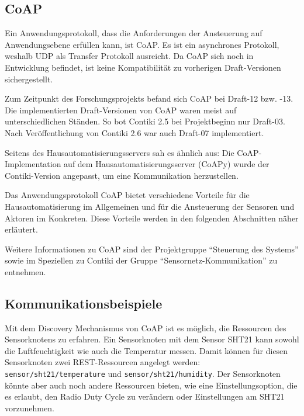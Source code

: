 \subsection{CoAP}
	Ein Anwendungsprotokoll, dass die Anforderungen der Ansteuerung
	auf Anwendungsebene erfüllen kann, ist CoAP. Es ist ein asynchrones
	Protokoll, weshalb UDP als Transfer Protokoll ausreicht.  Da CoAP sich
	noch in Entwicklung befindet, ist keine Kompatibilität zu vorherigen
	Draft-Versionen sichergestellt.

	Zum Zeitpunkt des Forschungsprojekts befand sich CoAP bei Draft-12 bzw.
	-13. Die implementierten Draft-Versionen von CoAP waren meist auf
	unterschiedlichen Ständen.  So bot Contiki 2.5 bei Projektbeginn nur
	Draft-03. Nach Veröffentlichung von Contiki 2.6 war auch Draft-07
	implementiert.
	\autocite{kovatsch11low-power}
	
	Seitens des Hausautomatisierungsservers sah es ähnlich aus: Die
	CoAP-Implementation auf dem Hausautomatisierungsserver (CoAPy) wurde
	der Contiki-Version angepasst, um eine Kommunikation herzustellen.

	Das Anwendungsprotokoll CoAP bietet verschiedene Vorteile
	für die Hausautomatisierung im Allgemeinen und für die Ansteuerung
	der Sensoren und Aktoren im Konkreten. Diese Vorteile werden
	in den folgenden Abschnitten näher erläutert.

	Weitere Informationen zu CoAP sind der Projektgruppe
	\enquote{Steuerung des Systems} sowie im Speziellen zu Contiki
	der Gruppe \enquote{Sensornetz-Kommunikation} zu entnehmen.

\subsection{Kommunikationsbeispiele}
	Mit dem Discovery Mechanismus von CoAP ist es möglich, die
	Ressourcen des Sensorknotens zu erfahren.
	Ein Sensorknoten mit dem Sensor SHT21 kann sowohl die Luftfeuchtigkeit
	wie auch die Temperatur messen.
	Damit können für diesen Sensorknoten zwei
	REST-Ressourcen angelegt werden: \lstinline=sensor/sht21/temperature=
	und \lstinline=sensor/sht21/humidity=.
	Der Sensorknoten könnte aber auch noch andere Ressourcen bieten,
	wie eine Einstellungsoption, die es erlaubt,
	den Radio Duty Cycle zu verändern oder Einstellungen am SHT21
	vorzunehmen.

